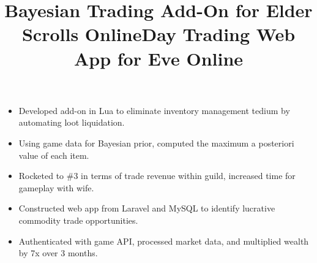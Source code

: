 \documentclass[12pt]{res} %
\begin{document}
\begin{resume}

        \employer{}
        \title{\textbf{Bayesian Trading Add-On for Elder Scrolls Online}}
        \dates{}
        \begin{position}
          \vspace{-28pt}
          \begin{itemize}[leftmargin=-0.4cm, rightmargin=0.8cm]
          \itemsep0em
          \item Developed add-on in Lua to eliminate inventory management tedium by automating loot liquidation.
          \item Using game data for Bayesian prior, computed the maximum a posteriori value of each item.
          \item Rocketed to \#3 in terms of trade revenue within guild, increased time for gameplay with wife.
          \end{itemize}
        \end{position}
        \vspace{-10pt}

        \employer{}
        \title{\textbf{Day Trading Web App for Eve Online}}
        \dates{}
        \begin{position}
          \vspace{-28pt}
          \begin{itemize}[leftmargin=-0.4cm, rightmargin=0.8cm]
          \itemsep0em
          \item Constructed web app from Laravel and MySQL to  identify lucrative commodity trade opportunities.
          \item Authenticated with game API, processed market data, and multiplied wealth by 7x over 3 months.
          \end{itemize}
        \end{position}
        \vspace{-10pt}


\end{resume}
\end{document}
